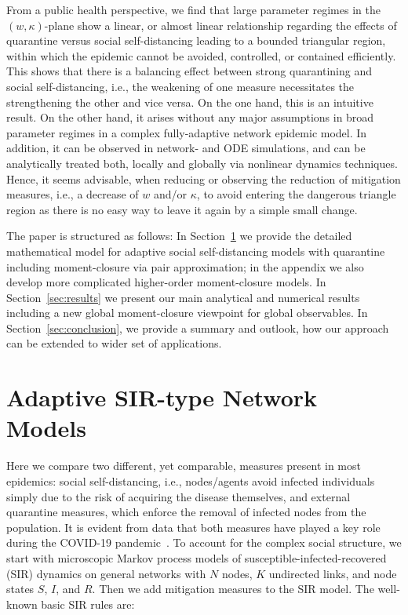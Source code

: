 \documentclass[12pt]{article}
\begin{document}
From a public health perspective, we find that large parameter regimes in the $(w,\kappa)$-plane show a linear, or almost linear relationship regarding the effects of quarantine versus social self-distancing leading to a bounded triangular region, within which the epidemic cannot be avoided, controlled, or contained efficiently. This shows that there is a balancing effect between strong quarantining and social self-distancing, i.e., the weakening of one measure necessitates the strengthening the other and vice versa. On the one hand, this is an intuitive result. On the other hand, it arises without any major assumptions in broad parameter regimes in a complex fully-adaptive network epidemic model. In addition, it can be observed in network- and ODE simulations, and can be analytically treated both, locally and globally via nonlinear dynamics techniques. Hence, it seems advisable, when reducing or observing the reduction of mitigation measures, i.e., a decrease of $w$ and/or $\kappa$, to avoid entering the dangerous triangle region as there is no easy way to leave it again
by a simple small change.\medskip  

The paper is structured as follows: In Section~\ref{sec:model} we provide the detailed mathematical model for adaptive social self-distancing models with quarantine including moment-closure via pair approximation; in the appendix we also develop more complicated higher-order moment-closure models. In Section~\ref{sec:results} we present our main analytical and numerical results including a new global moment-closure viewpoint for global observables. In Section~\ref{sec:conclusion}, we provide a summary and outlook, how our approach can be extended to wider set of applications. 

\section{Adaptive SIR-type Network Models}
\label{sec:model}

Here we compare two different, yet comparable, measures present in most epidemics: social self-distancing, i.e., nodes/agents avoid infected individuals simply due to the risk of acquiring the disease themselves, and external quarantine measures, which enforce the removal of infected nodes from the population. It is evident from data that both measures have played a key role during the COVID-19 pandemic~\cite{MaierBrockmann,Kucharskietal,Giordanoetal}. To account for the complex social structure, we start with microscopic Markov process  models of susceptible-infected-recovered (SIR) dynamics on general networks with $N$ nodes, $K$ undirected links, and node states $S$, $I$, and $R$. Then we add mitigation measures to the SIR model. The well-known basic SIR rules are:
\end{document}
